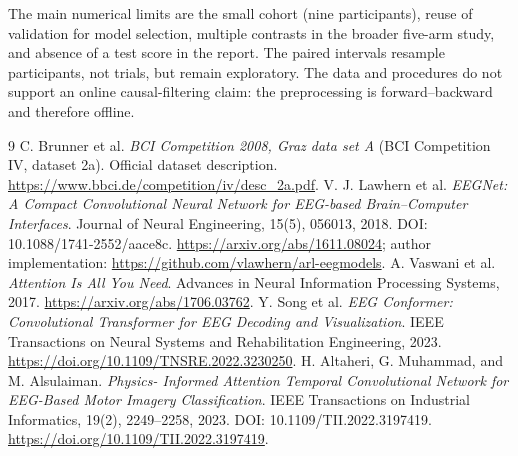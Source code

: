 \documentclass[11pt,a4paper]{article}
\begin{document}
The main numerical limits are the small cohort (nine participants), reuse of
validation for model selection, multiple contrasts in the broader five-arm
study, and absence of a test score in the report. The paired intervals resample
participants, not trials, but remain exploratory. The data and procedures do
not support an online causal-filtering claim: the preprocessing is
forward--backward and therefore offline.

\begin{thebibliography}{9}\small
{} C. Brunner et al. \emph{BCI Competition 2008, Graz data set A}
(BCI Competition IV, dataset 2a). Official dataset description.
\url{https://www.bbci.de/competition/iv/desc_2a.pdf}.
 V. J. Lawhern et al. \emph{EEGNet: A Compact Convolutional
Neural Network for EEG-based Brain--Computer Interfaces}. Journal of Neural
Engineering, 15(5), 056013, 2018. DOI: 10.1088/1741-2552/aace8c.
\url{https://arxiv.org/abs/1611.08024}; author implementation:
\url{https://github.com/vlawhern/arl-eegmodels}.
 A. Vaswani et al. \emph{Attention Is All You Need}.
Advances in Neural Information Processing Systems, 2017.
\url{https://arxiv.org/abs/1706.03762}.
 Y. Song et al. \emph{EEG Conformer: Convolutional
Transformer for EEG Decoding and Visualization}. IEEE Transactions on Neural
Systems and Rehabilitation Engineering, 2023.
\url{https://doi.org/10.1109/TNSRE.2022.3230250}.
 H. Altaheri, G. Muhammad, and M. Alsulaiman. \emph{Physics-
Informed Attention Temporal Convolutional Network for EEG-Based Motor Imagery
Classification}. IEEE Transactions on Industrial Informatics, 19(2),
2249--2258, 2023. DOI: 10.1109/TII.2022.3197419.
\url{https://doi.org/10.1109/TII.2022.3197419}.
\end{thebibliography}
\end{document}
